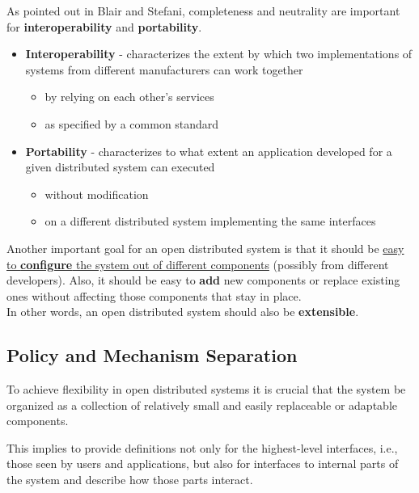 As pointed out in Blair and Stefani, completeness and neutrality are important for \textbf{interoperability} and \textbf{portability}.
\begin{itemize}
   \item \textbf{Interoperability} - characterizes the extent by which two implementations of
   systems from different manufacturers can work together
   \begin{itemize}
      \item by relying on each other’s services
      \item as specified by a common standard
   \end{itemize}
   \item \textbf{Portability} - characterizes to what extent an application developed for a
   given distributed system can executed
   \begin{itemize}
      \item without modification
      \item on a different distributed system implementing the same interfaces
   \end{itemize}
\end{itemize}


Another important goal for an open distributed system is that it should be \ul{easy to \textbf{configure} the system out of different components} (possibly from different developers).
Also, it should be easy to \textbf{add} new components or replace existing ones without affecting those components that stay in place.\\
In other words, an open distributed system should also be \textbf{extensible}.


\subsection{Policy and Mechanism Separation}

To achieve flexibility in open distributed systems
it is crucial that the system be organized as a collection of relatively small and easily replaceable or adaptable components.

This implies to provide definitions not only for the highest-level interfaces, i.e., those seen by users and applications, but also for interfaces to internal parts of the system and describe how those parts interact.

